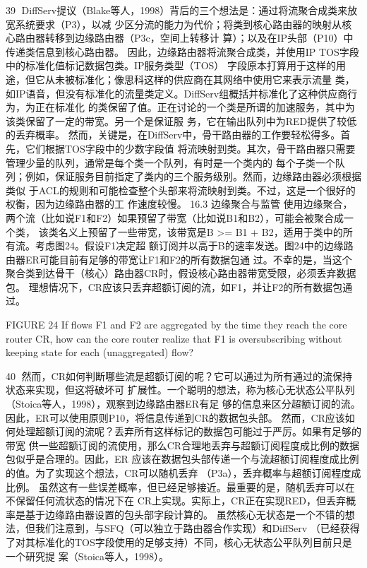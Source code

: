                                                    39
DiffServ提议（Blake等人，1998）背后的三个想法是：通过将流聚合成类来放宽系统要求（P3），以减
少区分流的能力为代价；将类到核心路由器的映射从核心路由器转移到边缘路由器（P3c，空间上转移计
算）；以及在IP头部（P10）中传递类信息到核心路由器。
因此，边缘路由器将流聚合成类，并使用IP TOS字段中的标准化值标记数据包类。IP服务类型（TOS）
字段原本打算用于这样的用途，但它从未被标准化；像思科这样的供应商在其网络中使用它来表示流量
类，如IP语音，但没有标准化的流量类定义。DiffServ组概括并标准化了这种供应商行为，为正在标准化
的类保留了值。正在讨论的一个类是所谓的加速服务，其中为该类保留了一定的带宽。另一个是保证服
务，它在输出队列中为RED提供了较低的丢弃概率。
然而，关键是，在DiffServ中，骨干路由器的工作要轻松得多。首先，它们根据TOS字段中的少数字段值
将流映射到类。其次，骨干路由器只需要管理少量的队列，通常是每个类一个队列，有时是一个类内的
每个子类一个队列；例如，保证服务目前指定了类内的三个服务级别。然而，边缘路由器必须根据类似
于ACL的规则和可能检查整个头部来将流映射到类。不过，这是一个很好的权衡，因为边缘路由器的工
作速度较慢。
16.3 边缘聚合与监管
使用边缘聚合，两个流（比如说F1和F2）如果预留了带宽（比如说B1和B2），可能会被聚合成一个类，
该类名义上预留了一些带宽，该带宽是B >= B1 + B2，适用于类中的所有流。考虑图24。假设F1决定超
额订阅并以高于B的速率发送。图24中的边缘路由器ER可能目前有足够的带宽让F1和F2的所有数据包通
过。不幸的是，当这个聚合类到达骨干（核心）路由器CR时，假设核心路由器带宽受限，必须丢弃数据
包。
理想情况下，CR应该只丢弃超额订阅的流，如F1，并让F2的所有数据包通过。




FIGURE 24 If flows F1 and F2 are aggregated by the time they reach the core router CR, how can
the core router realize that F1 is oversubscribing without keeping state for each (unaggregated)
flow?



                                                                                              40
然而，CR如何判断哪些流是超额订阅的呢？它可以通过为所有通过的流保持状态来实现，但这将破坏可
扩展性。一个聪明的想法，称为核心无状态公平队列（Stoica等人，1998），观察到边缘路由器ER有足
够的信息来区分超额订阅的流。因此，ER可以使用原则P10，将信息传递到CR的数据包头部。
然而，CR应该如何处理超额订阅的流呢？丢弃所有这样标记的数据包可能过于严厉。如果有足够的带宽
供一些超额订阅的流使用，那么CR合理地丢弃与超额订阅程度成比例的数据包似乎是合理的。因此，ER
应该在数据包头部传递一个与流超额订阅程度成比例的值。为了实现这个想法，CR可以随机丢弃
（P3a），丢弃概率与超额订阅程度成比例。
虽然这有一些误差概率，但已经足够接近。最重要的是，随机丢弃可以在不保留任何流状态的情况下在
CR上实现。实际上，CR正在实现RED，但丢弃概率是基于边缘路由器设置的包头部字段计算的。
虽然核心无状态是一个不错的想法，但我们注意到，与SFQ（可以独立于路由器合作实现）和DiffServ
（已经获得了对其标准化的TOS字段使用的足够支持）不同，核心无状态公平队列目前只是一个研究提
案（Stoica等人，1998）。

